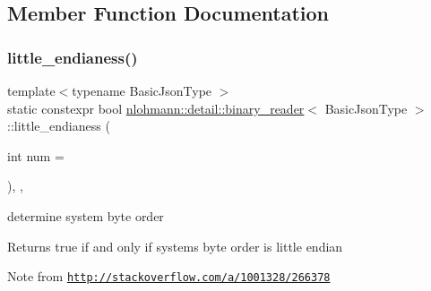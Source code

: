\subsection{Member Function Documentation}
\mbox{\label{classnlohmann_1_1detail_1_1binary__reader_a1d8f70f95d241354f86a0b9ae711c1c3}} 
\subsubsection{\texorpdfstring{little\+\_\+endianess()}{little\_endianess()}}
{\footnotesize\ttfamily template$<$typename Basic\+Json\+Type $>$ \\
static constexpr bool \mbox{\hyperlink{classnlohmann_1_1detail_1_1binary__reader}{nlohmann\+::detail\+::binary\+\_\+reader}}$<$ Basic\+Json\+Type $>$\+::little\+\_\+endianess (\begin{DoxyParamCaption}\item[{int}]{num = {} }\end{DoxyParamCaption})\hspace{0.3cm}{\ttfamily [inline]}, {\ttfamily [static]}, {\ttfamily [noexcept]}}



determine system byte order 

\begin{DoxyReturn}{Returns}
true if and only if system\textquotesingle{}s byte order is little endian
\end{DoxyReturn}
\begin{DoxyNote}{Note}
from \href{http://stackoverflow.com/a/1001328/266378}{\tt http\+://stackoverflow.\+com/a/1001328/266378} 
\end{DoxyNote}
\mbox{\label{classnlohmann_1_1detail_1_1binary__reader_a68ef932b48547bc4e6ce1df2856f6b8f}} 
